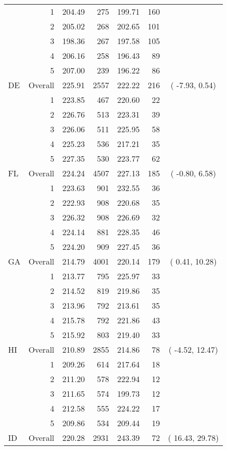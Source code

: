 \begin{longtable}{lrrr@{\extracolsep{.25cm}}rrc}
   & 1 & 204.49 & 275 & 199.71 & 160 &  \\ 
   & 2 & 205.02 & 268 & 202.65 & 101 &  \\ 
   & 3 & 198.36 & 267 & 197.58 & 105 &  \\ 
   & 4 & 206.16 & 258 & 196.43 &  89 &  \\ 
   & 5 & 207.00 & 239 & 196.22 &  86 &  \\ 
   \hline
DE & Overall & 225.91 & 2557 & 222.22 & 216 & ( -7.93,   0.54) \\ 
   & 1 & 223.85 & 467 & 220.60 &  22 &  \\ 
   & 2 & 226.76 & 513 & 223.31 &  39 &  \\ 
   & 3 & 226.06 & 511 & 225.95 &  58 &  \\ 
   & 4 & 225.23 & 536 & 217.21 &  35 &  \\ 
   & 5 & 227.35 & 530 & 223.77 &  62 &  \\ 
   \hline
FL & Overall & 224.24 & 4507 & 227.13 & 185 & ( -0.80,   6.58) \\ 
   & 1 & 223.63 & 901 & 232.55 &  36 &  \\ 
   & 2 & 222.93 & 908 & 220.68 &  35 &  \\ 
   & 3 & 226.32 & 908 & 226.69 &  32 &  \\ 
   & 4 & 224.14 & 881 & 228.35 &  46 &  \\ 
   & 5 & 224.20 & 909 & 227.45 &  36 &  \\ 
   \hline
GA & Overall & 214.79 & 4001 & 220.14 & 179 & (  0.41,  10.28) \\ 
   & 1 & 213.77 & 795 & 225.97 &  33 &  \\ 
   & 2 & 214.52 & 819 & 219.86 &  35 &  \\ 
   & 3 & 213.96 & 792 & 213.61 &  35 &  \\ 
   & 4 & 215.78 & 792 & 221.86 &  43 &  \\ 
   & 5 & 215.92 & 803 & 219.40 &  33 &  \\ 
   \hline
HI & Overall & 210.89 & 2855 & 214.86 &  78 & ( -4.52,  12.47) \\ 
   & 1 & 209.26 & 614 & 217.64 &  18 &  \\ 
   & 2 & 211.20 & 578 & 222.94 &  12 &  \\ 
   & 3 & 211.65 & 574 & 199.73 &  12 &  \\ 
   & 4 & 212.58 & 555 & 224.22 &  17 &  \\ 
   & 5 & 209.86 & 534 & 209.44 &  19 &  \\ 
   \hline
ID & Overall & 220.28 & 2931 & 243.39 &  72 & ( 16.43,  29.78) \\ 

\end{longtable}
